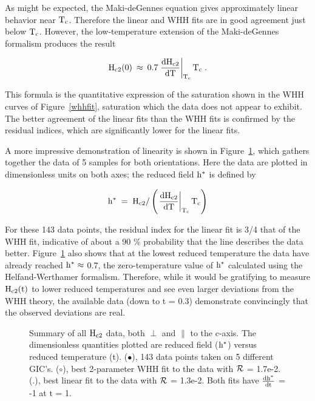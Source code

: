         As    might  be    expected,  the   Maki-deGennes   equation  gives
approximately linear behavior near $\rm T_c$.  Therefore the linear and WHH
fits  are  in   good  agreement   just below  $\rm   T_c$.    However,  the
low-temperature extension\cite{helfand66}   of the Maki-deGennes  formalism
produces the result

\[ \rm H_{c2}(0) \: \approx \: 0.7 \left.  \frac{dH_{c2}}{dT} \right|_{T_c}  T_c
\; .
\]

\noindent This formula is the quantitative expression of the saturation shown  in the
WHH curves of Figure~\ref{whhfit}, saturation which the data  does not appear
to exhibit.  The better agreement of the  linear fits than the WHH  fits is
confirmed by the residual  indices,  which are  significantly lower for the
linear fits.  

        A  more  impressive    demonstration of   linearity  is  shown   in
Figure~\ref{sumtemp}, which  gathers together the  data of 5 samples for both
orientations.  Here   the data are plotted  in  dimensionless units on both
axes; the reduced field $\rm h^*$ is defined by

\[ \rm h^* \; = \;  H_{c2}/ \left( \left. \frac{dH_{c2}}{dT}\right|_{T_c} T_c \right)
\]

\noindent  For these 143 data points, the residual index for the linear fit
is 3/4 that  of the WHH fit, indicative  of about a  90 \% probability that
the line describes the data better.  Figure~\ref{sumtemp} also shows that at
the   lowest reduced temperature  the  data   have already reached $\rm h^*
\approx$ 0.7, the zero-temperature value of  $\rm h^*$ calculated using the
Helfand-Werthamer\cite{helfand66}  formalism.  Therefore, while it would be
gratifying to measure $\rm H_{c2}(t)$ to lower reduced temperatures and see
even larger deviations from the WHH theory, the available data (down to t =
0.3) demonstrate convincingly that the observed deviations are real.

\begin{figure}
\vspace{5.5in}
\caption[Summary of $\rm H_{c2}$ data, both $\perp$ and $\parallel$ to
the c-axis.]{Summary of all $\rm H_{c2}$ data, both $\perp$ and $\parallel$
to the  c-axis.   The dimensionless quantities  plotted   are reduced field
($\rm h^*$) versus  reduced temperature  (t). ($\bullet$), 143  data points
taken on  5 different GIC's.   ($\circ$),  best 2-parameter WHH  fit to the
data with $\cal R$ = 1.7e-2.   (.), best linear fit  to the data with $\cal
R$ = 1.3e-2.  Both fits have $\rm \frac{dh^*}{dt}$ = -1 at t = 1.}
\label{sumtemp}
\end{figure}

